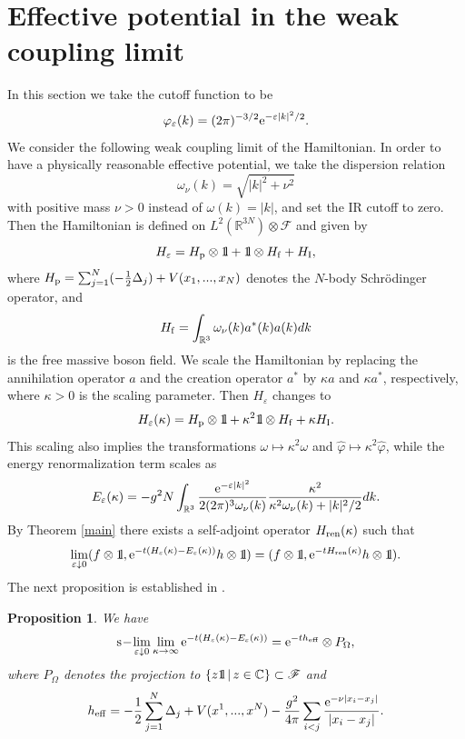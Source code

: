 \documentclass[11pt]{article}
\newtheorem{proposition}[theorem]{Proposition}
\providecommand{\bp}[1]{\begin{proposition}\label{#1}}
\providecommand{\ep}{\end{proposition}}
\def\bbbone{{\mathchoice {\rm 1\mskip-4mu l} {\rm 1\mskip-4mu l}
{\rm 1\mskip-4.5mu l} {\rm 1\mskip-5mu l}}}
\def\one{\bbbone}
\providecommand{\eq}[1]{\begin{equation}\label{#1}}
\providecommand{\en}{\end{equation}}
\providecommand{\BR}{{\mathbb{R}^3 }}
\providecommand{\CC}{{\mathbb{C}}}
\providecommand{\RR}{\mathbb{R}}
\providecommand{\hn}{H}%
\providecommand{\fff}{\mathscr{F}}
\providecommand{\add}{a^\ast}
\providecommand{\hf}{H_{\rm f}}
\providecommand{\half}{\frac{1}{2}}
\providecommand{\hi}{H_{\rm I}}
\providecommand{\hp}{H_{\rm p}}
\providecommand{\slim}{{\rm s}\!-\!\lim}
\providecommand{\vp}{{\widehat \varphi}}
\providecommand{\vp}{\mathop{\mathrm{{\varphi}}}\nolimits}
\providecommand{\e}{{\rm e}}
\providecommand{\1}{\mathbb{1}}
\providecommand{\eps}{\varepsilon}
\providecommand{\ren}{{\rm ren}}
\begin{document}
\section{Effective potential in the weak coupling limit}
In this section we take the cutoff function to be
$$
\varphi_\eps(k)= (2\pi)^{-3/2}\e^{-\eps|k|^2/2}.
$$
We consider the following weak coupling limit of the Hamiltonian. In order to have a physically reasonable
effective potential, we take the dispersion relation
$$
\omega_\nu(k)=\sqrt{|k|^2+\nu^2}
$$
with positive mass $\nu>0$ instead of $\omega(k)=|k|$, and set the IR cutoff to zero. Then the Hamiltonian
is defined on $L^2(\RR^{3N})\otimes\fff$ and given by
$$
\hn_\eps=\hp\otimes\one+\one\otimes\hf+\hi,
$$
where $\hp=\sum_{j=1}^N (-\half \Delta_j) +V(x_1,...,x_N)$ denotes the $N$-body Schr\"odinger operator, and
$$
\hf=\int_\BR \omega_\nu(k)\add(k) a(k)dk
$$
is the free massive boson field. We scale the Hamiltonian by replacing the annihilation operator $a$ and the
creation operator $\add$ by $\kappa a$ and $\kappa \add$, respectively, where $\kappa>0$ is the scaling
parameter. Then $\hn_\eps$ changes to
\eq{weak}
\hn_\eps(\kappa)=\hp\otimes \one +\kappa^2 \one\otimes\hf+\kappa \hi.
\en
This scaling also implies the transformations $\omega\mapsto \kappa^2 \omega$ and $\vp\mapsto \kappa^2\vp$,
while the energy renormalization term scales as
\eq{energy}
E_\eps(\kappa)=-g^2 N  \int_\BR \frac{\e^{-\eps |k|^2}}{2(2\pi)^3 \omega_\nu(k)}
\frac{\kappa^2}{\kappa^2\omega_\nu(k)+|k|^2/2} dk.
\en
By Theorem \ref{main} there exists a self-adjoint operator $H_{\ren}(\kappa)$ such that
\eq{main2}
\lim_{\eps\downarrow 0} (f\otimes\one, \e^{-t(H_\eps(\kappa)-E_\eps(\kappa))}
h\otimes  \one)=(f\otimes\one, \e^{-tH_{\ren}(\kappa)}h\otimes \one).
\en
The next proposition is established in \cite{dav79,hir99}.
\bp{wcl}
We have
$$
\slim_{\eps\downarrow 0} \lim_{\kappa\to\infty} \e^{-t(\hn_\eps(\kappa)-E_\eps(\kappa))}=
\e^{-th_{\rm eff}}\otimes P_\Omega,
$$
where $P_\Omega$ denotes the projection to $\{z\one\,|\,z\in\CC\}\subset\fff$ and
$$
h_{\rm eff}=-\half \sum_{j=1}^N \Delta_j + V(x^1,...,x^N)-\frac{g^2}{4\pi }\sum_{i<j}
\frac{\e^{-\nu|x_i-x_j|}}{|x_i-x_j|}.
$$
\ep
\end{document}
